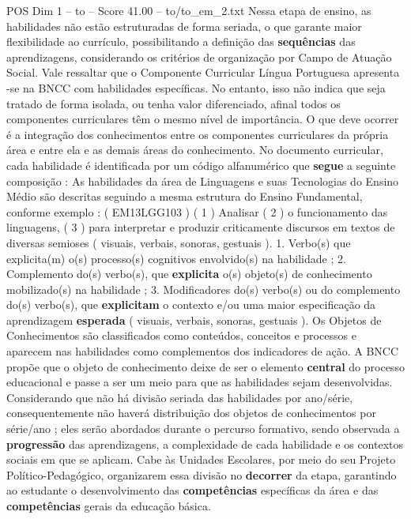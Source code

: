 \begin{textsample}{POS Dim 1 – to – Score 41.00 – to/to\_em\_2.txt}
Nessa etapa de ensino, as habilidades não estão estruturadas de forma seriada, o que garante maior flexibilidade ao currículo, possibilitando a definição das \textbf{sequências} das aprendizagens, considerando os critérios de organização por Campo de Atuação Social.
Vale ressaltar que o Componente Curricular Língua Portuguesa apresenta -se na BNCC com habilidades específicas.
No entanto, isso não indica que seja tratado de forma isolada, ou tenha valor diferenciado, afinal todos os componentes curriculares têm o mesmo nível de importância.
O que deve ocorrer é a integração dos conhecimentos entre os componentes curriculares da própria área e entre ela e as demais áreas do conhecimento.
No documento curricular, cada habilidade é identificada por um código alfanumérico que \textbf{segue} a seguinte composição : As habilidades da área de Linguagens e suas Tecnologias do Ensino Médio são descritas seguindo a mesma estrutura do Ensino Fundamental, conforme exemplo : ( EM13LGG103 ) ( 1 ) Analisar ( 2 ) o funcionamento das linguagens, ( 3 ) para interpretar e produzir criticamente discursos em textos de diversas semioses ( visuais, verbais, sonoras, gestuais ). 1.
Verbo(s) que explicita(m) o(s) processo(s) cognitivos envolvido(s) na habilidade ; 2.
Complemento do(s) verbo(s), que \textbf{explicita} o(s) objeto(s) de conhecimento mobilizado(s) na habilidade ; 3.
Modificadores do(s) verbo(s) ou do complemento do(s) verbo(s), que \textbf{explicitam} o contexto e/ou uma maior especificação da aprendizagem \textbf{esperada} ( visuais, verbais, sonoras, gestuais ).
Os Objetos de Conhecimentos são classificados como conteúdos, conceitos e processos e aparecem nas habilidades como complementos dos indicadores de ação.
A BNCC propõe que o objeto de conhecimento deixe de ser o elemento \textbf{central} do processo educacional e passe a ser um meio para que as habilidades sejam desenvolvidas.
Considerando que não há divisão seriada das habilidades por ano/série, consequentemente não haverá distribuição dos objetos de conhecimentos por série/ano ; eles serão abordados durante o percurso formativo, sendo observada a \textbf{progressão} das aprendizagens, a complexidade de cada habilidade e os contextos sociais em que se aplicam.
Cabe às Unidades Escolares, por meio do seu Projeto Político-Pedagógico, organizarem essa divisão no \textbf{decorrer} da etapa, garantindo ao estudante o desenvolvimento das \textbf{competências} específicas da área e das \textbf{competências} gerais da educação básica.

\end{textsample}
